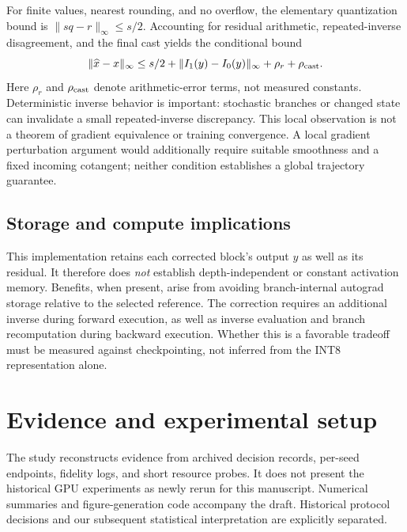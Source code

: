 \documentclass[10pt]{article}
\begin{document}
For finite values, nearest rounding, and no overflow, the elementary quantization bound is $\lVert sq-r\rVert_\infty\le s/2$. Accounting for residual arithmetic, repeated-inverse disagreement, and the final cast yields the conditional bound
\begin{equation}
\lVert\widehat{x}-x\rVert_\infty\le s/2+
\lVert I_1(y)-I_0(y)\rVert_\infty+\rho_r+\rho_{\rm cast}.
\end{equation}
Here $\rho_r$ and $\rho_{\rm cast}$ denote arithmetic-error terms, not measured constants. Deterministic inverse behavior is important: stochastic branches or changed state can invalidate a small repeated-inverse discrepancy. This local observation is not a theorem of gradient equivalence or training convergence. A local gradient perturbation argument would additionally require suitable smoothness and a fixed incoming cotangent; neither condition establishes a global trajectory guarantee.

\subsection{Storage and compute implications}
This implementation retains each corrected block's output $y$ as well as its residual. It therefore does \emph{not} establish depth-independent or constant activation memory. Benefits, when present, arise from avoiding branch-internal autograd storage relative to the selected reference. The correction requires an additional inverse during forward execution, as well as inverse evaluation and branch recomputation during backward execution. Whether this is a favorable tradeoff must be measured against checkpointing, not inferred from the INT8 representation alone.

\section{Evidence and experimental setup}
The study reconstructs evidence from archived decision records, per-seed endpoints, fidelity logs, and short resource probes. It does not present the historical GPU experiments as newly rerun for this manuscript. Numerical summaries and figure-generation code accompany the draft. Historical protocol decisions and our subsequent statistical interpretation are explicitly separated.
\end{document}
